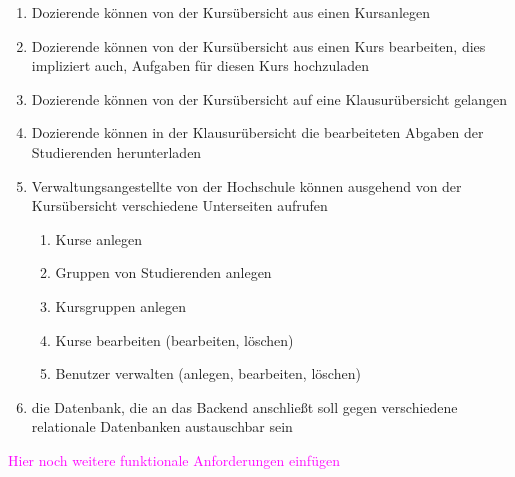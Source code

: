 \begin{enumerate}
	\item \gls{Dozierende} können von der Kursübersicht aus einen \gls{Kurs}anlegen
	\item \gls{Dozierende} können von der Kursübersicht aus einen \gls{Kurs} bearbeiten, dies impliziert auch, \gls{Aufgabe}n für diesen \gls{Kurs} hochzuladen
	\item \gls{Dozierende} können von der Kursübersicht auf eine Klausurübersicht gelangen
	\item \gls{Dozierende} können in der Klausurübersicht die bearbeiteten Abgaben der \gls{Studierende}n herunterladen
	\item \gls{Verwaltungsangestellte} von der Hochschule können ausgehend von der Kursübersicht verschiedene Unterseiten aufrufen
	\begin{enumerate}
		\item \gls{Kurs}e anlegen
	 	\item Gruppen von Studierenden anlegen
		\item Kursgruppen anlegen
		\item \gls{Kurs}e bearbeiten (bearbeiten, löschen)
		\item Benutzer verwalten (anlegen, bearbeiten, löschen)
	\end{enumerate}	 
	\item die Datenbank, die an das Backend anschließt soll gegen verschiedene \gls{relationale Datenbank}en austauschbar sein
\end{enumerate}

\textcolor{magenta}{Hier noch weitere funktionale Anforderungen einfügen}